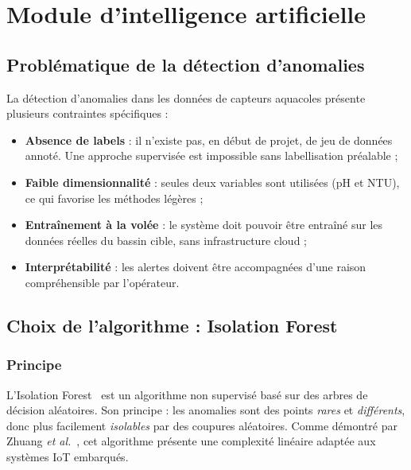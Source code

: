 \documentclass[12pt,a4paper]{report}
\begin{document}
\chapter{Module d'intelligence artificielle}
\label{chap:ia}

\section{Problématique de la détection d'anomalies}

La détection d'anomalies dans les données de capteurs aquacoles présente plusieurs
contraintes spécifiques :

\begin{itemize}
  \item \textbf{Absence de labels} : il n'existe pas, en début de projet, de jeu de données
        annoté. Une approche supervisée est impossible sans labellisation préalable ;
  \item \textbf{Faible dimensionnalité} : seules deux variables sont utilisées (pH et NTU),
        ce qui favorise les méthodes légères ;
  \item \textbf{Entraînement à la volée} : le système doit pouvoir être entraîné sur les
        données réelles du bassin cible, sans infrastructure cloud ;
  \item \textbf{Interprétabilité} : les alertes doivent être accompagnées d'une raison
        compréhensible par l'opérateur.
\end{itemize}

\section{Choix de l'algorithme : Isolation Forest}

\subsection{Principe}

L'Isolation Forest~\cite{liu2008isolation} est un algorithme non supervisé basé sur
des arbres de décision aléatoires. Son principe : les anomalies sont des points
\textit{rares} et \textit{différents}, donc plus facilement \textit{isolables} par des
coupures aléatoires. Comme démontré par Zhuang \textit{et al.}~\cite{zhuang2023bsiforest},
cet algorithme présente une complexité linéaire adaptée aux systèmes IoT embarqués.
\end{document}
